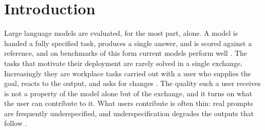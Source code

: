 %

\section{Introduction}

Large language models are evaluated, for the most part, alone. A model is handed a fully
specified task, produces a single answer, and is scored against a reference, and on
benchmarks of this form current models perform well \cite{liang2023holistic}. The tasks
that motivate their deployment are rarely solved in a single exchange. Increasingly they
are workplace tasks carried out with a user who supplies the goal, reacts to the output,
and asks for changes \cite{anthropic2025economicindex, laban2025lost}. The quality such a
user receives is not a property of the model alone but of the exchange, and it turns on
what the user can contribute to it. What users contribute is often thin: real prompts are
frequently underspecified, and underspecification degrades the outputs that follow
\cite{yang2025underspecification}.

